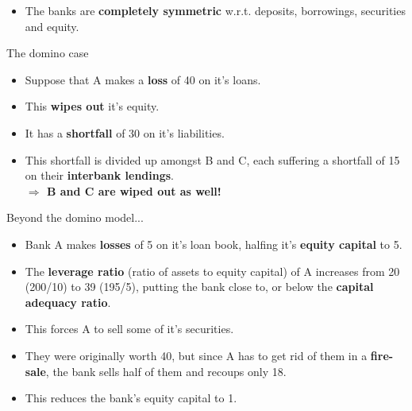 \documentclass[11pt]{beamer}
\newcommand{\mcdr}[1]{{{\bf \color{red4}#1}}}
\newcommand{\mcdgr}[1]{{{\bf \color{DarkGreen}#1}}}
\newcommand{\mcdbl}[1]{{{\bf \color{navy}#1}}}
\begin{document}
\begin{frame}
 \begin{itemize}
  \item The banks are \mcdbl{completely symmetric} w.r.t. deposits, borrowings, securities and equity.
 \end{itemize}
\begin{block}{The domino case}
  \begin{itemize}
  \item Suppose that A makes a \mcdr{loss} of 40 on it's loans.
  \item This \mcdr{wipes out} it's equity.
  \item It has a \mcdr{shortfall} of 30 on it's liabilities.
  \item This shortfall is divided up amongst B and C, each suffering a shortfall of 15 on their \mcdr{interbank lendings}.\\
        \hfill \mcdr{$\Rightarrow$ B and C are wiped out as well!}
 \end{itemize}
\end{block}

\end{frame}

\begin{frame}
\begin{block}{Beyond the domino model...}
  \begin{itemize}
   \item Bank A makes \mcdr{losses} of 5 on it's loan book, halfing it's \mcdbl{equity capital} to 5.
   \item The \mcdbl{leverage ratio} (ratio of assets to equity capital) of A increases from 20 (200/10) to 39 (195/5), putting the bank close to, or
 below the \mcdgr{capital adequacy ratio}.
   \item This forces A to sell some of it's securities.
   \item They were originally worth 40, but since A has to get rid of them in a \mcdr{fire-sale}, the bank sells half of them and recoups only 18.
   \item This reduces the bank's equity capital to 1.
  \end{itemize}
\end{block}

\end{frame}
\end{document}
